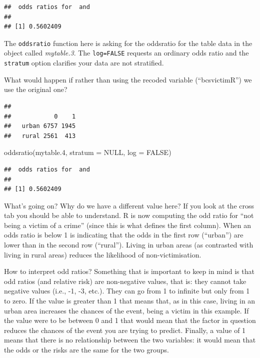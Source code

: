 \documentclass[
]{book}
\newenvironment{Shaded}{\begin{snugshade}}{\end{snugshade}}
\newcommand{\AttributeTok}[1]{\textcolor[rgb]{0.77,0.63,0.00}{#1}}
\newcommand{\ConstantTok}[1]{\textcolor[rgb]{0.00,0.00,0.00}{#1}}
\newcommand{\FloatTok}[1]{\textcolor[rgb]{0.00,0.00,0.81}{#1}}
\newcommand{\FunctionTok}[1]{\textcolor[rgb]{0.00,0.00,0.00}{#1}}
\newcommand{\NormalTok}[1]{#1}
\newcommand{\OtherTok}[1]{\textcolor[rgb]{0.56,0.35,0.01}{#1}}
\newcommand{\SpecialCharTok}[1]{\textcolor[rgb]{0.00,0.00,0.00}{#1}}
\begin{document}
\begin{verbatim}
##  odds ratios for  and  
## 
## [1] 0.5602409
\end{verbatim}

The \texttt{oddsratio} function here is asking for the oddsratio for the table data in the object called \emph{mytable.3}. The \texttt{log=FALSE} requests an ordinary odds ratio and the \texttt{stratum} option clarifies your data are not stratified.

What would happen if rather than using the recoded variable (``bcsvictimR'') we use the original one?

\begin{Shaded}
\end{Shaded}

\begin{verbatim}
##        
##            0    1
##   urban 6757 1945
##   rural 2561  413
\end{verbatim}

\begin{Shaded}
\begin{Highlighting}[]
\FunctionTok{oddsratio}\NormalTok{(mytable}\FloatTok{.4}\NormalTok{, }\AttributeTok{stratum =} \ConstantTok{NULL}\NormalTok{, }\AttributeTok{log =} \ConstantTok{FALSE}\NormalTok{)}
\end{Highlighting}
\end{Shaded}

\begin{verbatim}
##  odds ratios for  and  
## 
## [1] 0.5602409
\end{verbatim}

What's going on? Why do we have a different value here? If you look at the cross tab you should be able to understand. R is now computing the odd ratio for ``not being a victim of a crime'' (since this is what defines the first column). When an odds ratio is below 1 is indicating that the odds in the first row (``urban'') are lower than in the second row (``rural''). Living in urban areas (as contrasted with living in rural areas) reduces the likelihood of non-victimisation.

How to interpret odd ratios? Something that is important to keep in mind is that odd ratios (and relative risk) are non-negative values, that is: they cannot take negative values (i.e., -1, -3, etc.). They can go from 1 to infinite but only from 1 to zero. If the value is greater than 1 that means that, as in this case, living in an urban area increases the chances of the event, being a victim in this example. If the value were to be between 0 and 1 that would mean that the factor in question reduces the chances of the event you are trying to predict. Finally, a value of 1 means that there is no relationship between the two variables: it would mean that the odds or the risks are the same for the two groups.
\end{document}
